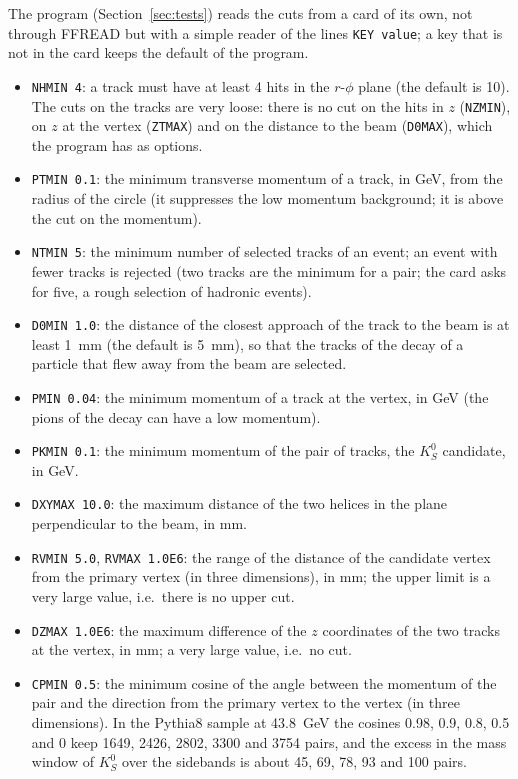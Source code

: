 
The program (Section~\ref{sec:tests}) reads the cuts from a card of its own, not through FFREAD but with a simple reader of the lines \texttt{KEY value}; a key that is not in the card keeps the default of the program.
\begin{itemize}
\item \texttt{NHMIN 4}: a track must have at least 4 hits in the $r$-$\phi$ plane (the default is 10). The cuts on the tracks are very loose: there is no cut on the hits in $z$ (\texttt{NZMIN}), on $z$ at the vertex (\texttt{ZTMAX}) and on the distance to the beam (\texttt{D0MAX}), which the program has as options.
\item \texttt{PTMIN 0.1}: the minimum transverse momentum of a track, in GeV, from the radius of the circle (it suppresses the low momentum background; it is above the cut on the momentum).
\item \texttt{NTMIN 5}: the minimum number of selected tracks of an event; an event with fewer tracks is rejected (two tracks are the minimum for a pair; the card asks for five, a rough selection of hadronic events).
\item \texttt{D0MIN 1.0}: the distance of the closest approach of the track to the beam is at least 1~mm (the default is 5~mm), so that the tracks of the decay of a particle that flew away from the beam are selected.
\item \texttt{PMIN 0.04}: the minimum momentum of a track at the vertex, in GeV (the pions of the decay can have a low momentum).
\item \texttt{PKMIN 0.1}: the minimum momentum of the pair of tracks, the $K^0_S$ candidate, in GeV.
\item \texttt{DXYMAX 10.0}: the maximum distance of the two helices in the plane perpendicular to the beam, in mm.
\item \texttt{RVMIN 5.0}, \texttt{RVMAX 1.0E6}: the range of the distance of the candidate vertex from the primary vertex (in three dimensions), in mm; the upper limit is a very large value, i.e.\ there is no upper cut.
\item \texttt{DZMAX 1.0E6}: the maximum difference of the $z$ coordinates of the two tracks at the vertex, in mm; a very large value, i.e.\ no cut.
\item \texttt{CPMIN 0.5}: the minimum cosine of the angle between the momentum of the pair and the direction from the primary vertex to the vertex (in three dimensions). In the Pythia8 sample at 43.8~GeV the cosines 0.98, 0.9, 0.8, 0.5 and 0 keep 1649, 2426, 2802, 3300 and 3754 pairs, and the excess in the mass window of $K^0_S$ over the sidebands is about 45, 69, 78, 93 and 100 pairs.

\end{itemize}
